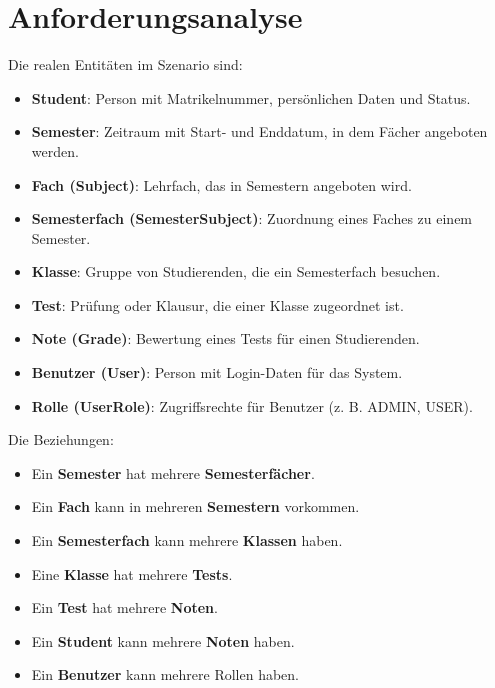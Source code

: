 \documentclass[12pt,a4paper]{article}
\begin{document}
    \section{Anforderungsanalyse}
    Die realen Entitäten im Szenario sind:

    \begin{itemize}
        \item \textbf{Student}: Person mit Matrikelnummer, persönlichen Daten und Status.
        \item \textbf{Semester}: Zeitraum mit Start- und Enddatum, in dem Fächer angeboten werden.
        \item \textbf{Fach (Subject)}: Lehrfach, das in Semestern angeboten wird.
        \item \textbf{Semesterfach (SemesterSubject)}: Zuordnung eines Faches zu einem Semester.
        \item \textbf{Klasse}: Gruppe von Studierenden, die ein Semesterfach besuchen.
        \item \textbf{Test}: Prüfung oder Klausur, die einer Klasse zugeordnet ist.
        \item \textbf{Note (Grade)}: Bewertung eines Tests für einen Studierenden.
        \item \textbf{Benutzer (User)}: Person mit Login-Daten für das System.
        \item \textbf{Rolle (UserRole)}: Zugriffsrechte für Benutzer (z. B. ADMIN, USER).
    \end{itemize}

    Die Beziehungen:
    \begin{itemize}
        \item Ein \textbf{Semester} hat mehrere \textbf{Semesterfächer}.
        \item Ein \textbf{Fach} kann in mehreren \textbf{Semestern} vorkommen.
        \item Ein \textbf{Semesterfach} kann mehrere \textbf{Klassen} haben.
        \item Eine \textbf{Klasse} hat mehrere \textbf{Tests}.
        \item Ein \textbf{Test} hat mehrere \textbf{Noten}.
        \item Ein \textbf{Student} kann mehrere \textbf{Noten} haben.
        \item Ein \textbf{Benutzer} kann mehrere Rollen haben.
    \end{itemize}

\end{document}
